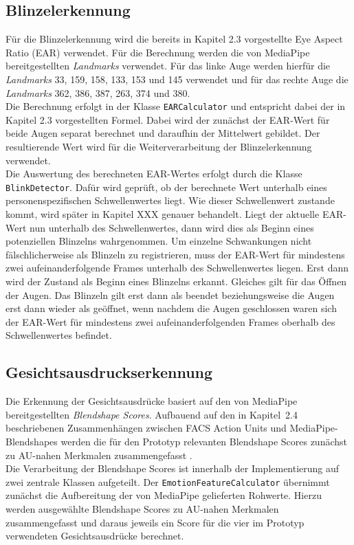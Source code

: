 \documentclass[intern]{cgMA}
\begin{document}
\subsection{Blinzelerkennung}
Für die Blinzelerkennung wird die bereits in
Kapitel 2.3 vorgestellte Eye Aspect Ratio (EAR) verwendet. Für die Berechnung werden die von MediaPipe bereitgestellten \textit{Landmarks} verwendet. Für das linke Auge werden hierfür die \textit{Landmarks} 33, 159,
158, 133, 153 und 145 verwendet und für das rechte Auge die \textit{Landmarks} 362, 386, 387, 263, 374 und 380. \\
Die Berechnung erfolgt in der Klasse \texttt{EARCalculator} und entspricht dabei der in Kapitel 2.3 vorgestellten Formel. Dabei wird der zunächst der EAR-Wert für beide Augen separat berechnet und daraufhin der Mittelwert gebildet. Der resultierende Wert wird für die Weiterverarbeitung der Blinzelerkennung verwendet.\\
Die Auswertung des berechneten EAR-Wertes erfolgt durch die Klasse \\ \texttt{BlinkDetector}. Dafür wird geprüft, ob der berechnete Wert unterhalb eines personenspezifischen Schwellenwertes liegt. Wie dieser Schwellenwert zustande kommt, wird später in Kapitel XXX genauer behandelt. Liegt der aktuelle EAR-Wert nun unterhalb des Schwellenwertes, dann wird dies als Beginn eines potenziellen Blinzelns wahrgenommen. Um einzelne Schwankungen nicht fälschlicherweise als Blinzeln zu registrieren, muss der EAR-Wert für mindestens zwei aufeinanderfolgende Frames unterhalb des Schwellenwertes liegen. Erst dann wird der Zustand als Beginn eines Blinzelns erkannt. Gleiches gilt für das Öffnen der Augen. Das Blinzeln gilt erst dann als beendet beziehungsweise die Augen erst dann wieder als geöffnet, wenn nachdem die Augen geschlossen waren sich der EAR-Wert für mindestens zwei aufeinanderfolgenden Frames oberhalb des Schwellenwertes befindet.\\
\subsection{Gesichtsausdruckserkennung}
Die Erkennung der Gesichtsausdrücke basiert auf den von MediaPipe
bereitgestellten \textit{Blendshape Scores}. Aufbauend auf den in
Kapitel~2.4 beschriebenen Zusammenhängen zwischen FACS Action Units
und MediaPipe-Blendshapes werden die für den Prototyp relevanten
Blendshape Scores zunächst zu AU-nahen Merkmalen zusammengefasst
\cite{turrisi2026blendshape}.\\
Die Verarbeitung der Blendshape Scores ist innerhalb der Implementierung
auf zwei zentrale Klassen aufgeteilt. Der
\texttt{EmotionFeatureCalculator} übernimmt zunächst die Aufbereitung
der von MediaPipe gelieferten Rohwerte. Hierzu werden ausgewählte
Blendshape Scores zu AU-nahen Merkmalen zusammengefasst und daraus
jeweils ein Score für die vier im Prototyp verwendeten
Gesichtsausdrücke berechnet.\\
\end{document}

